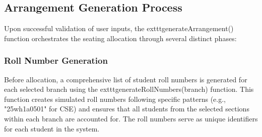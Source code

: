 \documentclass{article}
\begin{document}
\subsection{Arrangement Generation Process}
Upon successful validation of user inputs, the 	exttt{generateArrangement()} function orchestrates the seating allocation through several distinct phases:

\subsubsection{Roll Number Generation}
Before allocation, a comprehensive list of student roll numbers is generated for each selected branch using the 	exttt{generateRollNumbers(branch)} function. This function creates simulated roll numbers following specific patterns (e.g., "25wh1a0501" for CSE) and ensures that all students from the selected sections within each branch are accounted for. The roll numbers serve as unique identifiers for each student in the system.
\end{document}
